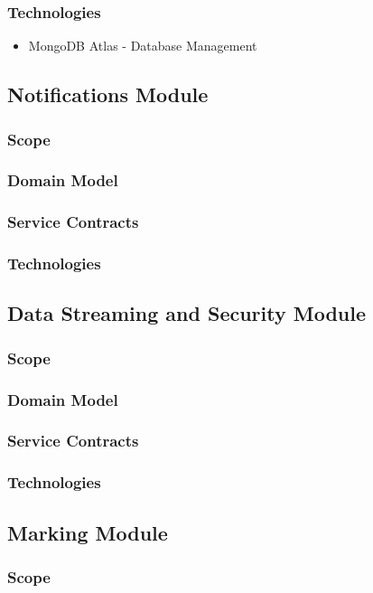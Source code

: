 \documentclass{article}
\begin{document}
		\subsubsection{Technologies}
			\begin{itemize}
				\item MongoDB Atlas - Database Management
			\end{itemize}
	\subsection{Notifications Module}
		\subsubsection{Scope}
		\subsubsection{Domain Model}
		\subsubsection{Service Contracts}
		\subsubsection{Technologies}
		
	\subsection{Data Streaming and Security Module}
		\subsubsection{Scope}
		\subsubsection{Domain Model}
		\subsubsection{Service Contracts}
		\subsubsection{Technologies}

	\subsection{Marking Module}
		\subsubsection{Scope}
\end{document}
